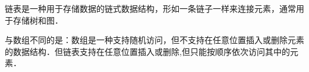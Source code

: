 
链表是一种用于存储数据的链式数据结构，形如一条链子一样来连接元素，通常用于存储树和图．

与数组不同的是：数组是一种支持随机访问，但不支持在任意位置插入或删除元素的数据结构．但链表支持在任意位置插入或删除,但只能按顺序依次访问其中的元素．

